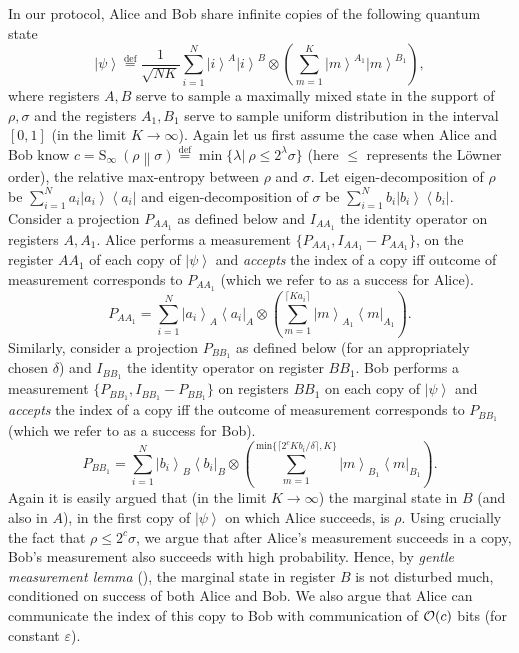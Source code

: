 \documentclass[11pt,a4paper]{article}
\def\O{\CMcal{O}}
\theoremstyle{plain}
\theoremstyle{definition}
\newcommand {\br} [1] {\ensuremath{ \left( #1 \right) }}
\newcommand {\minusspace} {\: \! \!}
\newcommand {\fn} [2] {\ensuremath{ #1 \minusspace \br{ #2 } }}
\newcommand {\defeq} {\ensuremath{ \stackrel{\mathrm{def}}{=} }}
\newcommand {\rminent} [2] {\fn{\mathrm{S}_{\infty}}{#1 \middle\| #2}}
\newcommand {\bra} [1] {\ensuremath{ \left\langle #1 \right| }}
\newcommand {\ket} [1] {\ensuremath{ \left| #1 \right\rangle }}
\def\ve{{\varepsilon}}
\begin{document}
In our protocol, Alice and Bob share infinite copies of the following quantum state 
\[\ket{\psi} \defeq \frac{1}{\sqrt{NK}}\sum_{i=1}^N\ket{i}^A\ket{i}^B\otimes \left(\sum_{m=1}^K\ket{m}^{A_1}\ket{m}^{B_1} \right),\]
where registers $A,B$ serve to sample a maximally mixed state in the support of $\rho, \sigma$ and the registers $A_1,B_1$ serve to sample uniform distribution in the interval $[0,1]$ (in the limit $K \rightarrow \infty$).  Again let us first assume the case when Alice and Bob know  $c = \rminent{\rho}{\sigma} \defeq \min\{\lambda |~ \rho \leq 2^\lambda \sigma \}$ (here $\leq$ represents the L\"{o}wner order), the relative max-entropy between $\rho$ and $\sigma$.  Let eigen-decomposition of $\rho$ be $ \sum_{i=1}^N a_i \ket{a_i}\bra{a_i}$ and eigen-decomposition of $\sigma$ be $\sum_{i=1}^N b_i \ket{b_i}\bra{b_i}$. Consider a projection $P_{AA_1}$ as defined below and $I_{AA_1}$ the identity operator on registers $A,A_1$. Alice performs a measurement $\{P_{AA_1},I_{AA_1}-P_{AA_1}\}$, on the register $AA_1$ of each copy of $\ket{\psi}$ and \textit{accepts} the index of a copy iff outcome of measurement corresponds to $P_{AA_1}$ (which we refer to as a success for Alice). 
\begin{equation*}
P_{AA_1}=\sum_{i=1}^N\ket{a_i}_A\bra{a_i}_A\otimes \left(\sum_{m=1}^{\lceil Ka_i \rceil}\ket{m}_{A_1}\bra{m}_{A_1}\right) .
\end{equation*}
Similarly, consider a projection $P_{BB_1}$ as defined below (for an appropriately chosen $\delta$) and $I_{BB_1}$ the identity operator on register $BB_1$. Bob performs a measurement $\{P_{BB_1},I_{BB_1}-P_{BB_1}\}$  on registers $BB_1$ on each copy of $\ket{\psi}$ and \textit{accepts} the index of a copy iff the outcome of measurement corresponds to $P_{BB_1}$ (which we refer to as a success for Bob).
\begin{equation*}
P_{BB_1}=\sum_{i=1}^N\ket{b_i}_B\bra{b_i}_B\otimes \left(\sum_{m=1}^{\text{min}\{\lceil 2^{c}K b_i/\delta\rceil, K\}}\ket{m}_{B_1}\bra{m}_{B_1}\right) .
\end{equation*}
Again it is easily argued that (in the limit $K \rightarrow \infty$) the marginal state in $B$ (and also in $A$), in the first copy of $\ket{\psi}$ on which Alice succeeds, is $\rho$.  Using crucially the fact that $\rho \leq 2^c \sigma$, we argue that after Alice's measurement succeeds in a copy, Bob's measurement also succeeds with high probability. Hence, by {\em gentle measurement lemma} (\cite{Winter:1999,Ogawa:2002}), the marginal state in register $B$ is not disturbed much, conditioned on success of both Alice and Bob.  We also argue that Alice can communicate the index of this copy to Bob with communication of $\O(c)$ bits (for constant $\ve$).
\end{document}
